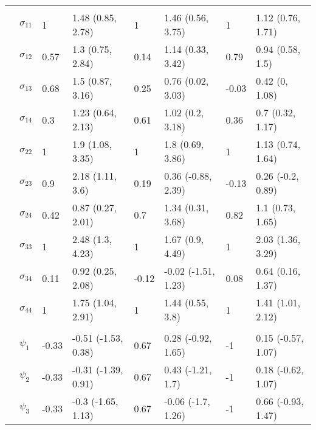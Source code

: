 \documentclass[]{article}
\begin{document}
\begin{table}[t]
\begin{tabular}{llllllll}
\addlinespace[0.3em]
\multicolumn{8}{l}{\textbf{ }}\\
\hspace{1em} & $\sigma_{11}$ & 1 & 1.48 (0.85, 2.78) & 1 & 1.46 (0.56, 3.75) & 1 & 1.12 (0.76, 1.71)\\
\hspace{1em} & $\sigma_{12}$ & 0.57 & 1.3 (0.75, 2.84) & 0.14 & 1.14 (0.33, 3.42) & 0.79 & 0.94 (0.58, 1.5)\\
\hspace{1em} & $\sigma_{13}$ & 0.68 & 1.5 (0.87, 3.16) & 0.25 & 0.76 (0.02, 3.03) & -0.03 & 0.42 (0, 1.08)\\
\hspace{1em} & $\sigma_{14}$ & 0.3 & 1.23 (0.64, 2.13) & 0.61 & 1.02 (0.2, 3.18) & 0.36 & 0.7 (0.32, 1.17)\\
\hspace{1em} & $\sigma_{22}$ & 1 & 1.9 (1.08, 3.35) & 1 & 1.8 (0.69, 3.86) & 1 & 1.13 (0.74, 1.64)\\
\hspace{1em} & $\sigma_{23}$ & 0.9 & 2.18 (1.11, 3.6) & 0.19 & 0.36 (-0.88, 2.39) & -0.13 & 0.26 (-0.2, 0.89)\\
\hspace{1em} & $\sigma_{24}$ & 0.42 & 0.87 (0.27, 2.01) & 0.7 & 1.34 (0.31, 3.68) & 0.82 & 1.1 (0.73, 1.65)\\
\hspace{1em} & $\sigma_{33}$ & 1 & 2.48 (1.3, 4.23) & 1 & 1.67 (0.9, 4.49) & 1 & 2.03 (1.36, 3.29)\\
\hspace{1em} & $\sigma_{34}$ & 0.11 & 0.92 (0.25, 2.08) & -0.12 & -0.02 (-1.51, 1.23) & 0.08 & 0.64 (0.16, 1.37)\\
\hspace{1em} & $\sigma_{44}$ & 1 & 1.75 (1.04, 2.91) & 1 & 1.44 (0.55, 3.8) & 1 & 1.41 (1.01, 2.12)\\
\addlinespace[0.3em]
\multicolumn{8}{l}{\textbf{ }}\\
\hspace{1em} & $\psi_{1}$ & -0.33 & -0.51 (-1.53, 0.38) & 0.67 & 0.28 (-0.92, 1.65) & -1 & 0.15 (-0.57, 1.07)\\
\hspace{1em} & $\psi_{2}$ & -0.33 & -0.31 (-1.39, 0.91) & 0.67 & 0.43 (-1.21, 1.7) & -1 & 0.18 (-0.62, 1.07)\\
\hspace{1em} & $\psi_{3}$ & -0.33 & -0.3 (-1.65, 1.13) & 0.67 & -0.06 (-1.7, 1.26) & -1 & 0.66 (-0.93, 1.47)\\

\end{tabular}
\end{table}
\end{document}
